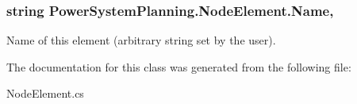 \subsubsection[{\texorpdfstring{Name}{Name}}]{\setlength{\rightskip}{0pt plus 5cm}string Power\+System\+Planning.\+Node\+Element.\+Name\hspace{0.3cm}{\ttfamily [get]}, {\ttfamily [set]}}\hypertarget{class_power_system_planning_1_1_node_element_a07a0b254e0ac3b4b97dd45bde0a44291}{}\label{class_power_system_planning_1_1_node_element_a07a0b254e0ac3b4b97dd45bde0a44291}


Name of this element (arbitrary string set by the user). 



The documentation for this class was generated from the following file\+:\begin{DoxyCompactItemize}
\item 
Node\+Element.\+cs\end{DoxyCompactItemize}
